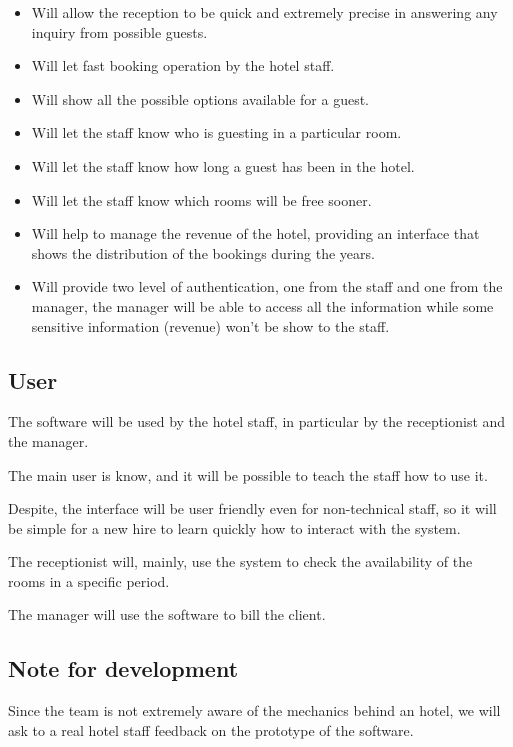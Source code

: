 \begin{itemize}

\item Will allow the reception to be quick and extremely precise in answering any inquiry from possible guests.

\item Will let fast booking operation by the hotel staff.

\item Will show all the possible options available for a guest.

\item Will let the staff know who is guesting in a particular room.

\item Will let the staff know how long a guest has been in the hotel.

\item Will let the staff know which rooms will be free sooner.

\item Will help to manage the revenue of the hotel, providing an interface that shows the distribution of the bookings during the years.

\item Will provide two level of authentication, one from the staff and one from the manager, the manager will be able to access all the information while some sensitive information (revenue) won't be show to the staff.

\end{itemize}

\subsection{User}

The software will be used by the hotel staff, in particular by the receptionist and the manager.

The main user is know, and it will be possible to teach the staff how to use it.

Despite, the interface will be user friendly even for non-technical staff, so it will be simple for a new hire to learn quickly how to interact with the system.

The receptionist will, mainly, use the system to check the availability of the rooms in a specific period.

The manager will use the software to bill the client.

\subsection{Note for development}

Since the team is not extremely aware of the mechanics behind an hotel, we will ask to a real hotel staff feedback on the prototype of the software.

